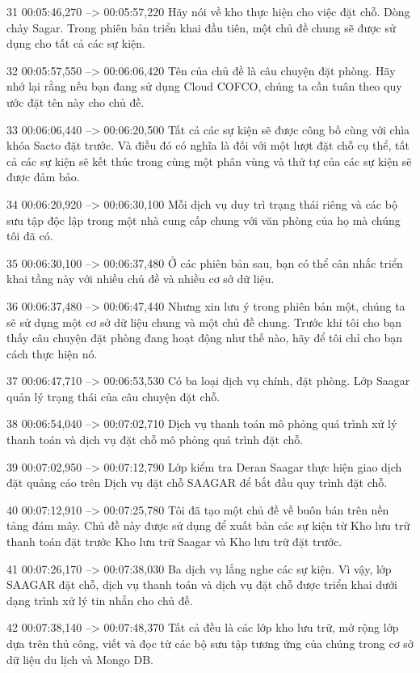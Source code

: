 31
00:05:46,270 --> 00:05:57,220
Hãy nói về kho thực hiện cho việc đặt chỗ.  Dòng chảy Sagar.  Trong phiên bản triển khai đầu tiên, một chủ đề chung sẽ được sử dụng cho tất cả các sự kiện.

32
00:05:57,550 --> 00:06:06,420
Tên của chủ đề là câu chuyện đặt phòng.  Hãy nhớ lại rằng nếu bạn đang sử dụng Cloud COFCO, chúng ta cần tuân theo quy ước đặt tên này cho chủ đề.

33
00:06:06,440 --> 00:06:20,500
Tất cả các sự kiện sẽ được công bố cùng với chìa khóa Sacto đặt trước.  Và điều đó có nghĩa là đối với một lượt đặt chỗ cụ thể, tất cả các sự kiện sẽ kết thúc trong cùng một phân vùng và thứ tự của các sự kiện sẽ được đảm bảo.

34
00:06:20,920 --> 00:06:30,100
Mỗi dịch vụ duy trì trạng thái riêng và các bộ sưu tập độc lập trong một nhà cung cấp chung với văn phòng của họ mà chúng tôi đã có.

35
00:06:30,100 --> 00:06:37,480
Ở các phiên bản sau, bạn có thể cân nhắc triển khai tầng này với nhiều chủ đề và nhiều cơ sở dữ liệu.

36
00:06:37,480 --> 00:06:47,440
Nhưng xin lưu ý trong phiên bản một, chúng ta sẽ sử dụng một cơ sở dữ liệu chung và một chủ đề chung.  Trước khi tôi cho bạn thấy câu chuyện đặt phòng đang hoạt động như thế nào, hãy để tôi chỉ cho bạn cách thực hiện nó.

37
00:06:47,710 --> 00:06:53,530
Có ba loại dịch vụ chính, đặt phòng.  Lớp Saagar quản lý trạng thái của câu chuyện đặt chỗ.

38
00:06:54,040 --> 00:07:02,710
Dịch vụ thanh toán mô phỏng quá trình xử lý thanh toán và dịch vụ đặt chỗ mô phỏng quá trình đặt chỗ.

39
00:07:02,950 --> 00:07:12,790
Lớp kiểm tra Deran Saagar thực hiện giao dịch đặt quảng cáo trên Dịch vụ đặt chỗ SAAGAR để bắt đầu quy trình đặt chỗ.

40
00:07:12,910 --> 00:07:25,780
Tôi đã tạo một chủ đề về buôn bán trên nền tảng đám mây.  Chủ đề này được sử dụng để xuất bản các sự kiện từ Kho lưu trữ thanh toán đặt trước Kho lưu trữ Saagar và Kho lưu trữ đặt trước.

41
00:07:26,170 --> 00:07:38,030
Ba dịch vụ lắng nghe các sự kiện.  Vì vậy, lớp SAAGAR đặt chỗ, dịch vụ thanh toán và dịch vụ đặt chỗ được triển khai dưới dạng trình xử lý tin nhắn cho chủ đề.

42
00:07:38,140 --> 00:07:48,370
Tất cả đều là các lớp kho lưu trữ, mở rộng lớp dựa trên thủ công, viết và đọc từ các bộ sưu tập tương ứng của chúng trong cơ sở dữ liệu du lịch và Mongo DB.

